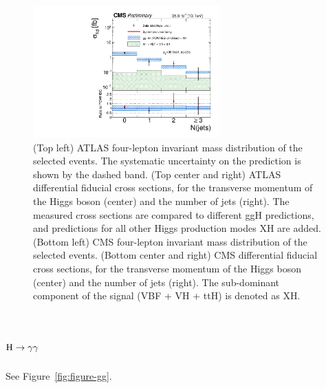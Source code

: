 \documentclass[10pt]{article}
\begin{document}
\begin{figure}[htb]
\includegraphics[height=2in]{figures/CMS-HIG-16-041__Figure_009-c__njets.pdf}
\caption{
  (Top left) ATLAS four-lepton invariant mass distribution of the selected
  events. The systematic uncertainty on the prediction is shown by the dashed
  band.
  (Top center and right) ATLAS differential fiducial cross sections, for the
  transverse momentum of the Higgs boson (center) and the number of jets (right).
  The measured cross sections are compared to different ggH predictions, and
  predictions for all other Higgs production modes XH are added.
  (Bottom left) CMS four-lepton invariant mass distribution of the selected
  events.
  (Bottom center and right) CMS differential fiducial cross sections, for the
  transverse momentum of the Higgs boson (center) and the number of jets (right).
  The sub-dominant component of the signal (VBF + VH + ttH) is denoted as XH.
}
\label{fig:figure-ZZ}
\end{figure}


\section{\boldmath ${\rm H}\to\gamma\gamma$}

See Figure~\ref{fig:figure-gg}.
\end{document}
